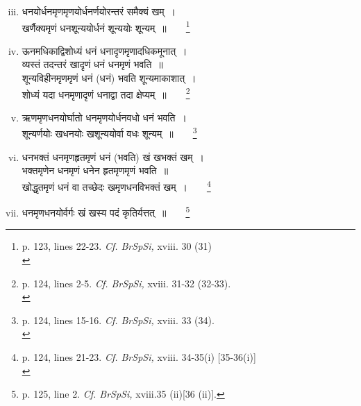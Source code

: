 \documentclass[10pt, openany]{book}
\begin{document}
\begin{enumerate}[(i)]
  \setcounter{enumi}{2}
 \item {\qt धनयोर्धनमृणमृणयोर्धनर्णयोरन्तरं समैक्यं खम्~। \\
 खर्णैक्यमृणं धनशून्ययोर्धनं शून्ययोः शून्यम्~॥}~~~~\renewcommand{\thefootnote}{\hspace{-4.5mm} 3}\footnote{\hspace{-2mm} \englishfont p. 123, lines 22-23. \textit{Cf. BrSpSi,} xviii. 30 (31)\\} 

 \item {\qt ऊनमधिकाद्विशोध्यं धनं धनादृणमृणादधिकमूनात्~। \\
 व्यस्तं तदन्तरं खादृणं धनं धनमृणं भवति~॥ \\
 शून्यविहीनमृणमृणं धनं (धनं) भवति शून्यमाकाशात्~। \\
 शोध्यं यदा धनमृणादृणं धनाद्वा तदा क्षेप्यम्~॥}~~~~\renewcommand{\thefootnote}{\hspace{-4.5mm} 4}\footnote{\hspace{-2mm} \englishfont p. 124, lines 2-5. \textit{Cf. BrSpSi,} xviii. 31-32 (32-33).\\} 

 \item {\qt ऋणमृणधनयोर्घातो धनमृणयोर्धनवधो धनं भवति~। \\
 शून्यर्णयोः खधनयोः खशून्ययोर्वा वधः शून्यम्~॥}~~~~\renewcommand{\thefootnote}{\hspace{-4.5mm} 5}\footnote{\hspace{-2mm} \englishfont p. 124, lines 15-16. \textit{Cf. BrSpSi,} xviii. 33 (34).\\}

 \item {\qt धनभक्तं धनमृणहृतमृणं धनं (भवति) खं खभक्तं खम्~। \\
 भक्तमृणेन धनमृणं धनेन हृतमृणमृणं भवति~॥ \\
 खोद्धृतमृणं धनं वा तच्छेदः खमृणधनविभक्तं खम्~।}~~~~\renewcommand{\thefootnote}{\hspace{-4.5mm} 6}\footnote{\hspace{-2mm} \englishfont p. 124, lines 21-23. \textit{Cf. BrSpSi,} xviii. 34-35(i) [35-36(i)]\\} 

 \item {\qt धनमृणधनयोर्वर्गः खं खस्य पदं कृतिर्यत्तत्~॥}~~~~\renewcommand{\thefootnote}{\hspace{-4.5mm} 7}\footnote{\hspace{-2mm} \englishfont p.  125, line 2. \textit{Cf. BrSpSi,} xviii.35 (ii)[36 (ii)].}
 
 \end{enumerate}
\end{document}
